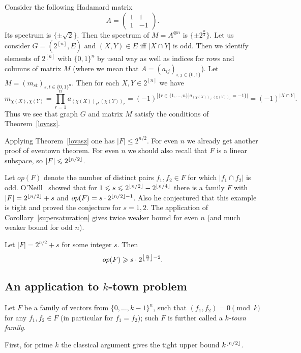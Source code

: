 \documentclass[8pt]{article}
\begin{document}
Consider the following Hadamard matrix
\[
A = 
\begin{pmatrix}
1 & 1 \\
1 & -1
\end{pmatrix}.
\]
Its spectrum is $\{\pm \sqrt{2}\}$. 
Then the spectrum of $M=A^{\otimes n}$ is $\{\pm 2^\frac{n}{2} \}$. 
Let us consider $G=(2^{[n]},E)$ and $(X,Y)\in E$ iff $|X\cap Y|$ is odd. Then we identify elements of $2^{[n]}$ with $\{0,1\}^n$ by usual way as well as indices for rows and columns of matrix $M$ (where we mean that  $A=(a_{ij})_{i,j\in \{0,1\}}$). Let $M=(m_{st})_{s,t\in \{0,1\}^n}$. Then for each $X,Y\in 2^{[n]}$ we have
\[
 m_{\chi(X),\chi(Y)}=\prod_{r=1}^n a_{(\chi(X))_r, (\chi(Y))_r}=(-1)^{|\{ r\in \{1,\dots,n\}| a_{(\chi(X))_r, (\chi(Y))_r}=-1 \}|}=(-1)^{|X\cap Y|}.
\]
Thus we see that graph $G$ and matrix $M$ satisfy the conditions of Theorem~\ref{lovasz}.

Applying Theorem~\ref{lovasz} one has $|F| \leq 2^{n/2}$. For even $n$ we already get another proof of eventown theorem.
For even $n$ we should also recall that $F$ is a linear subspace, so $|F| \leqslant 2^{\left\lfloor n/2 \right\rfloor}$.


Let $op(F)$ denote the number of distinct pairs $f_1, f_2 \in F$ for which $|f_1 \cap f_2|$ is odd.
O'Neill~\cite{oNeill2021towards} showed that for $1 \leqslant s \leqslant 2^{\left\lfloor n/2 \right\rfloor} - 2^{\left\lfloor n/4 \right\rfloor}$ there is a family $F$ with $|F| = 2^{\left\lfloor n/2 \right\rfloor} + s$
and $op(F) = s \cdot 2^{\left\lfloor n/2 \right\rfloor - 1}$.
Also he conjectured that this example is tight and proved the conjecture for $s = 1,2$.
The application of Corollary~\ref{supersaturation} gives twice weaker bound for even $n$ (and much weaker bound for odd $n$).

\begin{theorem}
\label{theoremop}
Let $|F| = 2^{n/2} + s$ for some integer $s$. Then
\[
op(F) \geqslant s \cdot 2^{\left\lfloor \frac{n}{2} \right\rfloor - 2}.
\]
\end{theorem}



\subsection{An application to $k$-town problem}


Let $F$ be a family of vectors from $\{0,\dots,k-1\}^n$, such that $(f_1,f_2) = 0 \pmod k$ for any $f_1,f_2 \in F$ (in particular for $f_1 = f_2$);
such $F$ is further called a \textit{$k$-town family}.

First, for prime $k$ the classical argument gives the tight upper bound $k^{\left\lfloor n /2\right\rfloor}$.
\end{document}
